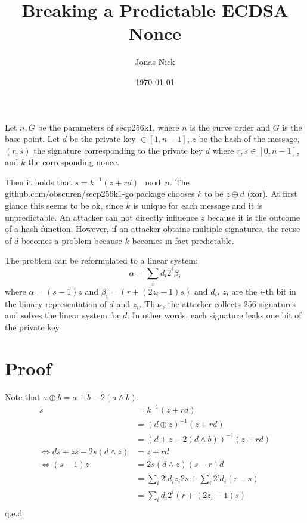 \documentclass[11pt,a4paper,oneside]{article}
\title{Breaking a Predictable ECDSA Nonce}
\date{\today}
\author{Jonas Nick}
\begin{document}
\maketitle 
Let $n, G$ be the parameters of secp256k1, where $n$ is the curve order and $G$ is the base point.
Let $d$ be the private key $\in [1, n-1]$, $z$ be the hash of the message, $(r,s)$ the signature corresponding
to the private key $d$ where $r,s \in [0, n-1]$, and $k$ the corresponding nonce.

Then it holds that $s=k^{-1}(z+rd)\mod n$. The github.com/obscuren/secp256k1-go package chooses $k$ to be
$z\oplus d$ (xor). 
At first glance this seems to be ok, since $k$ is unique for each message and
it is unpredictable. An attacker can not directly influence $z$ because it is the outcome of a hash function.
However, if an attacker obtains multiple signatures, the reuse of $d$ becomes a problem because $k$ 
becomes in fact predictable. 

The problem can be reformulated to a linear system:
\begin{equation}
    \alpha = \sum_i d_i 2^i \beta_i
\end{equation}
where $\alpha = (s-1)z$ and $\beta_i = (r + (2z_i - 1)s)$ and $d_i$, $z_i$ are the $i$-th bit in the binary representation of $d$ and $z_i$.
Thus, the attacker collects 256 signatures and solves the linear system for $d$. 
In other words, each signature leaks one bit of the private key.

\section{Proof}

Note that $a \oplus b = a + b - 2(a\wedge b)$.
\begin{align*}
s&=k^{-1}(z+rd) \\
    &= (d\oplus z)^{-1}(z+rd)\\
    &= (d + z - 2(d\wedge b))^{-1}(z+rd)\\
    \iff ds + zs - 2s(d\wedge z)&= z + rd\\
    \iff (s-1)z &= 2s(d\wedge z) (s-r)d\\
                &= \sum_i 2^i d_i z_i 2s + \sum_i 2^i d_i (r-s) \\
                &= \sum_i d_i 2^i (r + (2z_i - 1)s) \\
\end{align*}
q.e.d
\end{document}
